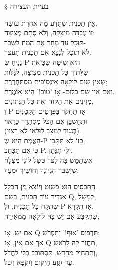 § בעיית העצירה

\leavevmode
\newline
אֵין תָּכְנִית שֶתֵּדַע מָה אֲחֶרֶת עוֹשָׂה.\\
זוֹ עֻבְדָּה מוּצָקָה, וְלֹא סְתָם מְצוּצָה:\\
תּוּכָל עַד מָחָר אֶת הַמֹּח לִשְבֹּר-\\

לֹא תּוּכַל לְנַבֵּא אִם תָּכְנִית תַּעֲצֹר.\\
נַנִּיחַ שֶ-P הִיא שִיטָה שֶכָּזֹאת\\
שֶלְּתוֹך כָּל תָּכְנִית מְצִיצָה, לְגַּלּוֹת\\
שֶאֵין שוּם לוּלָאָה אֵינְסוֹפִית מִסְתַּחְרֶרֶת;\\
וְאִם אֵין שָם כְּלוּם- אָז 'טוֹב!' הִיא אוֹמֶרֶת.\\

מְזִינִים אֶת הַקּוֹד וְאֶת כָּל הַנְּתוּנִים,\\
וְ-P אָז תַּחֲקֹר בַּפְּרָטִים הַקְּטַנִּים\\
וּתְחַשְבֵּן אִם הַכֹּל מִסְתַּדֵּר כָּרָאוּי\\
(בְּנִגּוּד לְמַצָּב לוּלָאִי לֹא רָצוּי).\\

הָאֱמֶת הִיא שֶ-P כָּזוֹ לֹא תִּתָּכֵן,\\
כִּי אִם תִּכָּתֵב P, וְלִי תִּנָּתֵן,\\
אֶשְתַּמֵּש בָּהּ לִצֹּר כֶּשֶל לוֹגִי מֻצְלָח\\
שֶיִּשְבֹּר הֶגְיוֹנְךָ וְחוּשֶיךָ יִמְעַךְ.\\
\leavevmode
\newline

הַתַּכְסִיס הוּא פָּשוּט וְיוֹצֵא מִן הַכְּלָל.\\
אַגְדִּיר עוֹד תָּכְנִית, בְּשֵם Q, לְמָשָל,\\
שֶתִּקַּח כָּל תָּכְנִית, וּלְ-P אָז תִּקְרָא,\\
שֶתִּקְבַּע אִם יֵש בָּהּ לוּלָאָה מַמְאִירָה;\\
\leavevmode
\newline

אִם יֵש, אָז Q תַּדְפִּיס 'אוּף!' וְתִפְרֹש;\\
אַךְ אִם אֵין, אָז Q תַּחֲזֹר לָהּ לָרֹאש,\\
וְתַתְחִיל מֵחָדָש, תִּסְתּוֹבֵב בְּלִי לַחֲדֹל,\\
עַד יִגְוַע הַיְּקוּם וְיִקְפָּא וְיִבֹּל.\\

\leavevmode
\newline

